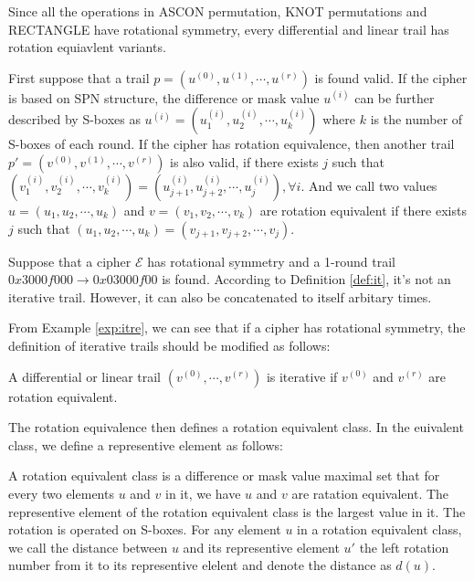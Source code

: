 Since all the operations in ASCON permutation, KNOT permutations and RECTANGLE have rotational symmetry, every differential and linear trail has rotation equiavlent variants. 

\begin{definition}
	First suppose that a trail $p=(u^{(0)},u^{(1)},\cdots,u^{(r)})$ is found valid. If the cipher is based on SPN structure, the difference or mask value $u^{(i)}$ can be further described by S-boxes as $u^{(i)}=(u_1^{(i)},u_2^{(i)},\cdots,u_k^{(i)})$ where $k$ is the number of S-boxes of each round. If the cipher has rotation equivalence, then another trail $p'=(v^{(0)},v^{(1)},\cdots,v^{(r)})$ is also valid, if there exists $j$ such that $(v_1^{(i)},v_2^{(i)},\cdots,v_k^{(i)})=(u_{j+1}^{(i)},u_{j+2}^{(i)},\cdots,u_{j}^{(i)}),\forall i$. And we call two values $u=(u_1,u_2,\cdots,u_k)$ and $v=(v_1,v_2,\cdots,v_k)$ are rotation equivalent if there exists $j$ such that $(u_1,u_2,\cdots,u_k)=(v_{j+1},v_{j+2},\cdots,v_{j})$. 
\end{definition}

\begin{example}\label{exp:itre}
	Suppose that a cipher $\mathcal{E}$ has rotational symmetry and a 1-round trail $0x3000f000\rightarrow 0x03000f00$ is found. According to Definition \ref{def:it}, it's not an iterative trail. However, it can also be concatenated to itself arbitary times.
\end{example}

From Example \ref{exp:itre}, we can see that if a cipher has rotational symmetry, the definition of iterative trails should be modified as follows:  

\begin{definition}
	A differential or linear trail $(v^{(0)},\cdots,v^{(r)})$ is iterative if $v^{(0)}$ and $v^{(r)}$ are rotation equivalent.
\end{definition}

The rotation equivalence then defines a rotation equivalent class. In the euivalent class, we define a representive element as follows:

\begin{definition}
	A rotation equivalent class is a difference or mask value maximal set that for every two elements $u$ and $v$ in it, we have $u$ and $v$ are ratation equivalent. The representive element of the rotation equivalent class is the largest value in it. The rotation is operated on S-boxes. For any element $u$ in a rotation equivalent class, we call the distance between $u$ and its representive element $u'$ the left rotation number from it to its representive elelent and denote the distance as $d(u)$. 
\end{definition}


